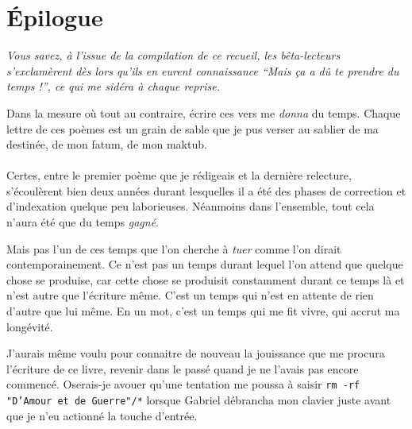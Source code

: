 \section*{Épilogue}
\thispagestyle{empty}
%
%
%
{\em\small
  Vous savez, à l’issue de la compilation de ce recueil, les bêta-lecteurs s’exclamèrent dès lors qu’ils en eurent connaissance \enquote{Mais ça a dû te \emph{prendre} du temps !}, ce qui me sidéra à chaque reprise.

  Dans la mesure où tout au contraire, écrire ces vers me \emph{donna} du temps. Chaque lettre de ces poèmes est un grain de sable que je pus verser au sablier de ma destinée, de mon fatum, de mon maktub.

  \paragraph{}
  Certes, entre le premier poème que je rédigeais et la dernière relecture, s’écoulèrent bien deux années durant lesquelles il a été des phases de correction et d’indexation quelque peu laborieuses. Néanmoins dans l’ensemble, tout cela n’aura été que du temps \emph{gagné}.

  Mais pas l’un de ces temps que l’on cherche à \emph{tuer} comme l’on dirait contemporainement. 
  Ce n’est pas un temps durant lequel l’on attend que quelque chose se produise, car cette chose se produisit constamment durant ce temps là et n’est autre que l’écriture même. C’est un temps qui n’est en attente de rien d’autre que lui même. En un mot, c’est un temps qui me fit vivre, qui accrut ma longévité.

  J’aurais même voulu pour connaitre de nouveau la jouissance que me procura l’écriture de ce livre, revenir dans le passé quand je ne l’avais pas encore commencé.
  Oserais-je avouer qu’une tentation me poussa à saisir \texttt{rm -rf "D’Amour et de Guerre"/*} lorsque Gabriel débrancha mon clavier juste avant que je n’eu actionné la touche d’entrée.

}
